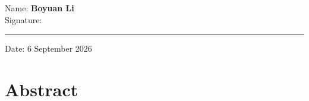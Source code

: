 \documentclass[11pt,oneside]{book}
\begin{document}
\noindent Name: \textbf{Boyuan Li}\\[4mm]

\noindent Signature:\\[1mm]
\rule[1em]{25em}{0.5pt}

\noindent Date: 6 September 2026\\[4mm]


\chapter*{Abstract}



\tableofcontents
\listoffigures
\listoftables


\mainmatter













\begin{appendices}


\end{appendices}
\end{document}
